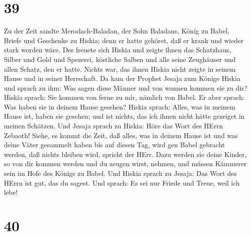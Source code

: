 \hypertarget{section-38}{%
\section{39}\label{section-38}}

 Zu der Zeit sandte Merodach-Baladan, der Sohn Baladans,
König zu Babel, Briefe und Geschenke zu Hiskia; denn er hatte gehöret,
daß er krank und wieder stark worden wäre.  Des freuete sich
Hiskia und zeigte ihnen das Schatzhaus, Silber und Gold und Spezerei,
köstliche Salben und alle seine Zeughäuser und allen Schatz, den er
hatte. Nichts war, das ihnen Hiskia nicht zeigte in seinem Hause und in
seiner Herrschaft.  Da kam der Prophet Jesaja zum Könige
Hiskia und sprach zu ihm: Was sagen diese Männer und von wannen kommen
sie zu dir? Hiskia sprach: Sie kommen von ferne zu mir, nämlich von
Babel.  Er aber sprach: Was haben sie in deinem Hause
gesehen? Hiskia sprach: Alles, was in meinem Hause ist, haben sie
gesehen; und ist nichts, das ich ihnen nicht hätte gezeiget in meinen
Schätzen.  Und Jesaja sprach zu Hiskia: Höre das Wort des
HErrn Zebaoth!  Siehe, es kommt die Zeit, daß alles, was in
deinem Hause ist und was deine Väter gesammelt haben bis auf diesen Tag,
wird gen Babel gebracht werden, daß nichts bleiben wird, spricht der
HErr.  Dazu werden sie deine Kinder, so von dir kommen
werden und du zeugen wirst, nehmen, und müssen Kämmerer sein im Hofe des
Königs zu Babel.  Und Hiskia sprach zu Jesaja: Das Wort des
HErrn ist gut, das du sagest. Und sprach: Es sei nur Friede und Treue,
weil ich lebe!

\hypertarget{section-39}{%
\section{40}\label{section-39}}


